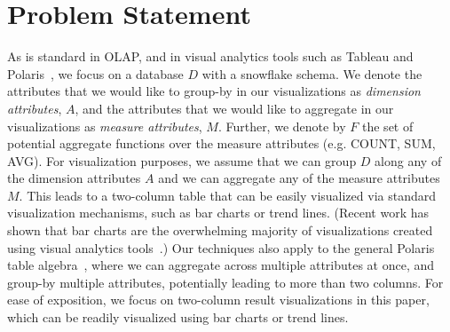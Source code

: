 \section{Problem Statement}
\label{sec:problem_statement}
As is standard in OLAP, and in visual analytics
tools such as Tableau and Polaris~\cite{tableau,polaris},
we focus on a database $D$ with a snowflake schema.
We denote the attributes
that we would like to group-by in our visualizations 
as {\em dimension attributes}, $A$, and 
the attributes that we would like to 
aggregate in our visualizations
as {\em measure attributes}, $M$.
Further, we denote by $F$ the set of potential
aggregate functions over the measure attributes (e.g. COUNT, SUM, AVG).  
For visualization purposes, we assume that we can group $D$ along any of the dimension attributes $A$ 
and we can aggregate any of the measure attributes $M$.
This leads to a two-column table that can be easily visualized
via standard visualization mechanisms, such as bar charts or trend lines.
(Recent work has shown that bar charts are the overwhelming majority of visualizations
created using visual analytics tools~\cite{DBLP:journals/pvldb/MortonBGM14}.) 
Our techniques also apply to the general Polaris table algebra~\cite{polaris}, where
we can aggregate across multiple attributes at once, and group-by multiple attributes, 
potentially leading to more than two columns.
For ease of exposition, we focus on two-column result visualizations in this paper,
which can be readily visualized using bar charts or trend lines.

